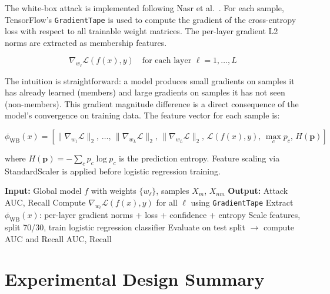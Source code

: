 \documentclass[12pt, a4paper]{report}
\begin{document}
The white-box attack is implemented following Nasr et al.~\cite{nasr2019comprehensive}.
For each sample, TensorFlow's \texttt{GradientTape} is used to compute the
gradient of the cross-entropy loss with respect to all trainable weight matrices.
The per-layer gradient L2 norms are extracted as membership features.

\begin{equation}
  \nabla_{w_\ell} \mathcal{L}(f(x), y) \quad \text{for each layer } \ell = 1, \ldots, L
\end{equation}

The intuition is straightforward: a model produces small gradients on samples it
has already learned (members) and large gradients on samples it has not seen
(non-members). This gradient magnitude difference is a direct consequence of the
model's convergence on training data. The feature vector for each sample is:

\begin{equation}
  \phi_{\text{WB}}(x) = \left[ \|\nabla_{w_1}\mathcal{L}\|_2,\,
  \ldots,\, \|\nabla_{w_L}\mathcal{L}\|_2,\,
  \|\nabla_{w_L}\mathcal{L}\|_2,\,
  \mathcal{L}(f(x),y),\, \max_c p_c,\, H(\mathbf{p}) \right]
\end{equation}

\noindent where $H(\mathbf{p}) = -\sum_c p_c \log p_c$ is the prediction entropy.
Feature scaling via StandardScaler is applied before logistic regression training.

\begin{algorithm}[H]
\caption{White-Box Gradient Membership Inference Attack}
\label{alg:whitebox}
\begin{algorithmic}[1]
\State \textbf{Input:} Global model $f$ with weights $\{w_\ell\}$, samples $X_m$, $X_{nm}$
\State \textbf{Output:} Attack AUC, Recall
    \State Compute $\nabla_{w_\ell} \mathcal{L}(f(x), y)$ for all $\ell$ using \texttt{GradientTape}
    \State Extract $\phi_{\text{WB}}(x)$: per-layer gradient norms + loss + confidence + entropy
\EndFor
\State Scale features, split 70/30, train logistic regression classifier
\State Evaluate on test split $\rightarrow$ compute AUC and Recall
\State \Return AUC, Recall
\end{algorithmic}
\end{algorithm}

\section{Experimental Design Summary}
\end{document}
